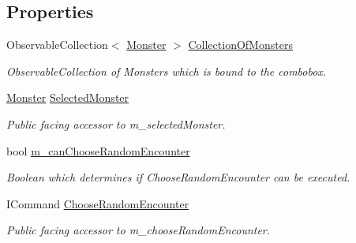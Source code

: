 \subsection*{Properties}
\begin{DoxyCompactItemize}
\item 
Observable\+Collection$<$ \mbox{\hyperlink{class_dungeons__n___dragons___manager_1_1_models_1_1_monster}{Monster}} $>$ \mbox{\hyperlink{class_dungeons__n___dragons___manager_1_1_viewmodels_1_1_encounters_tab_viewmodel_a694352ce5d43c05cf3dacc6987678062}{Collection\+Of\+Monsters}}
\begin{DoxyCompactList}\small\item\em Observable\+Collection of Monsters which is bound to the combobox. \end{DoxyCompactList}\item 
\mbox{\hyperlink{class_dungeons__n___dragons___manager_1_1_models_1_1_monster}{Monster}} \mbox{\hyperlink{class_dungeons__n___dragons___manager_1_1_viewmodels_1_1_encounters_tab_viewmodel_aff7d46c9f413602760226a2af43b1b26}{Selected\+Monster}}
\begin{DoxyCompactList}\small\item\em Public facing accessor to m\+\_\+selected\+Monster. \end{DoxyCompactList}\item 
bool \mbox{\hyperlink{class_dungeons__n___dragons___manager_1_1_viewmodels_1_1_encounters_tab_viewmodel_a88b0ac195a9d1381901bb2e0aaf9254e}{m\+\_\+can\+Choose\+Random\+Encounter}}
\begin{DoxyCompactList}\small\item\em Boolean which determines if Choose\+Random\+Encounter can be executed. \end{DoxyCompactList}\item 
I\+Command \mbox{\hyperlink{class_dungeons__n___dragons___manager_1_1_viewmodels_1_1_encounters_tab_viewmodel_a0e6a84c280a948068f81d22483ff605d}{Choose\+Random\+Encounter}}
\begin{DoxyCompactList}\small\item\em Public facing accessor to m\+\_\+choose\+Random\+Encounter. \end{DoxyCompactList}\end{DoxyCompactItemize}
